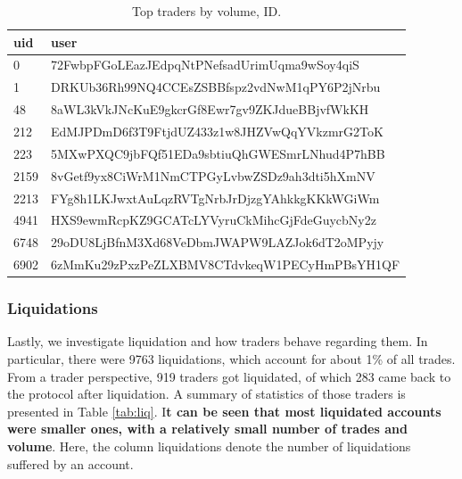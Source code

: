 \documentclass[]{scrartcl}
\begin{document}
	\begin{table}[]\scriptsize{
			\begin{tabular}{@{}ll@{}}
				\toprule
				uid        & user                                         \\ \midrule
				0          & 72FwbpFGoLEazJEdpqNtPNefsadUrimUqma9wSoy4qiS \\
				1          & DRKUb36Rh99NQ4CCEsZSBBfspz2vdNwM1qPY6P2jNrbu \\
				48         & 8aWL3kVkJNcKuE9gkcrGf8Ewr7gv9ZKJdueBBjvfWkKH \\
				212        & EdMJPDmD6f3T9FtjdUZ433z1w8JHZVwQqYVkzmrG2ToK \\
				223        & 5MXwPXQC9jbFQf51EDa9sbtiuQhGWESmrLNhud4P7hBB \\
				2159       & 8vGetf9yx8CiWrM1NmCTPGyLvbwZSDz9ah3dti5hXmNV \\
				2213       & FYg8h1LKJwxtAuLqzRVTgNrbJrDjzgYAhkkgKKkWGiWm \\
				4941       & HXS9ewmRcpKZ9GCATcLYVyruCkMihcGjFdeGuycbNy2z \\
				6748       & 29oDU8LjBfnM3Xd68VeDbmJWAPW9LAZJok6dT2oMPyjy \\
				6902       & 6zMmKu29zPxzPeZLXBMV8CTdvkeqW1PECyHmPBsYH1QF \\ \bottomrule
			\end{tabular}
			\caption{Top traders by volume, ID. \label{tab:tbv_ID}}}
	\end{table}
	
	
	\subsubsection*{Liquidations}
	Lastly, we investigate liquidation and how traders behave regarding them. In particular, there were  9763 liquidations, which account for about 1\% of all trades. From a trader perspective, 919 traders got liquidated, of which 283 came back to the protocol after liquidation. A summary of statistics of those traders is presented in Table \ref{tab:liq}. I\textbf{t can be seen that most liquidated accounts were smaller ones, with a relatively small number of trades and volume}. Here, the column liquidations denote the number of liquidations suffered by an account. 
	
\end{document}
